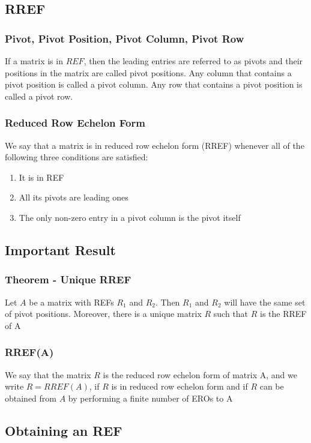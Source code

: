 \documentclass[12pt, letterpaper]{article}
\begin{document}
\subsection{RREF}
\subsubsection{Pivot, Pivot Position, Pivot Column, Pivot Row}
If a matrix is in $REF$, then the leading entries are referred to as pivots and their positions in the matrix are called pivot positions. 
Any column that contains a pivot position is called a pivot column. Any row that contains a pivot position is called a pivot row.
\subsubsection{Reduced Row Echelon Form}
We say that a matrix is in reduced row echelon form (RREF) whenever 
all of the following three conditions are satisfied:
\begin{enumerate}
    \item It is in REF
    \item All its pivots are leading ones 
    \item The only non-zero entry in a pivot column is the pivot itself
\end{enumerate}
\subsection*{Important Result}
\subsubsection{Theorem - Unique RREF}
Let $A$ be a matrix with REFs $R_1$ and $R_2$. Then $R_1$ and $R_2$ will have the same set of pivot positions. 
Moreover, there is a unique matrix $R$ such that $R$ is the RREF of A
\subsubsection{RREF(A)}
We say that the matrix $R$ is the reduced row echelon form of matrix A, and we write $R = RREF(A)$, if $R$ 
is in reduced row echelon form and if $R$ can be obtained from $A$ by performing a finite number of EROs to A
\subsection{Obtaining an REF}
\end{document}
